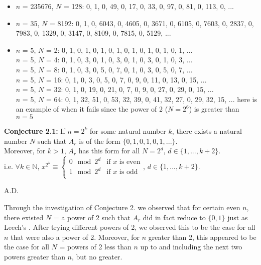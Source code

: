 \documentclass{article}
\begin{document}
\begin{flushleft}
\begin{itemize}
        \item $n$ = 235676, $N$ = 128:  0, 1, 0, 49, 0, 17, 0, 33, 0, 97, 0, 81, 0, 113, 0, ...
        \item $n$ = 35, $N$ = 8192:  0, 1, 0, 6043, 0, 4605, 0, 3671, 0, 6105, 0, 7603, 0, 2837, 0, 7983, 0, 1329, 0, 3147, 0, 8109, 0, 7815, 0, 5129, ...
        \item $n$ = 5, $N$ = 2:  0, 1, 0, 1, 0, 1, 0, 1, 0, 1, 0, 1, 0, 1, 0, 1, ...
            \\ $n$ = 5, $N$ = 4:  0, 1, 0, 3, 0, 1, 0, 3, 0, 1, 0, 3, 0, 1, 0, 3, ...
            \\ $n$ = 5, $N$ = 8:  0, 1, 0, 3, 0, 5, 0, 7, 0, 1, 0, 3, 0, 5, 0, 7, ...
            \\ $n$ = 5, $N$ = 16:  0, 1, 0, 3, 0, 5, 0, 7, 0, 9, 0, 11, 0, 13, 0, 15, ...
            \\ $n$ = 5, $N$ = 32:  0, 1, 0, 19, 0, 21, 0, 7, 0, 9, 0, 27, 0, 29, 0, 15, ...
            \\ $n$ = 5, $N$ = 64:  0, 1, 32, 51, 0, 53, 32, 39, 0, 41, 32, 27, 0, 29, 32, 15, ...
            here is an example of when it fails since the power of 2 ($N=2^6$) is greater than $n=5$
    \end{itemize}
    
\vspace{.1in}

{\bf Conjecture 2.1:} If $n=2^k$ for some natural number $k$, there exists a natural number $N$ such that $A_r$ is of the form $\{0,1,0,1,0,1,...\}$. \\
Moreover, for $k>1$, $A_r$ has this form for all $N=2^d$, $d\in\{1,...,k+2\}$. \\
    \vspace{.1in}
    \hspace{.2in} i.e. $\forall k\in{\mathbb{N}}$, $x^{2^k}\equiv 
    \begin{cases}
        0\mod 2^d  &  \text{if $x$ is even}\\
        1\mod 2^d  &  \text{if $x$ is odd}\\
    \end{cases}$, $d\in\{1,...,k+2\}$.

    \hspace{4.3in} A.D.

    Through the investigation of Conjecture 2. we observed that for certain even $n$, there existed $N$ = a power of 2 such that $A_r$ did in fact reduce to $\{0,1\}$ just as Leech's \cite{leech}. After trying different powers of 2, we observed this to be the case for all $n$ that were also a power of 2. Moreover, for $n$ greater than 2, this appeared to be the case for all $N$ = powers of 2 less than $n$ up to and including the next two powers greater than $n$, but no greater. 
    

\end{flushleft}
\end{document}
